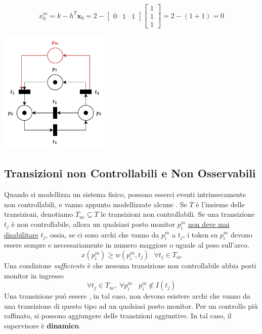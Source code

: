 \documentclass[10pt, letterpaper]{report}
\begin{document}
$$ x_0^m=k-h^T\mathbf x_0=2-\begin{bmatrix}
    0 & 1 & 1
\end{bmatrix}\begin{bmatrix}
    1 \\ 1 \\ 1
\end{bmatrix}=2-(1+1)=0$$\begin{center}
    \includegraphics[width=0.4\textwidth]{images/UsoMonitor2.drawio.pdf}
\end{center}
\subsection{Transizioni non Controllabili e Non Osservabili}
Quando si modellizza un sistema fisico, possono esserci eventi intrinsecamente non controllabili, e vanno appunto modellizzate alcune . Se $T$ è l'insieme delle transizioni, denotiamo $T_{uc}\subseteq T$ le transizioni non controllabili. \acc 
Se una transizione  $t_j$ è non controllabile, allora un qualsiasi posto monitor $p^m_i$ \underline{non deve mai disabilitare} $t_j$, ossia, se ci sono archi che vanno da $p^m_i$ a $t_j$, i token su $p^m_i$ devono essere sempre e necessariamente in numero maggiore o uguale al peso sull'arco. 
$$ x(p_i^m)\ge w(p_i^m,t_j) \ \ \ \forall t_j\in T_{uc}$$
Una condizione \textit{sufficiente} è che nessuna transizione non controllabile abbia posti monitor in ingresso 
$$ \forall t_j \in T_{uc}, \ \forall p_i^m \ \ \ \ p_i^m\notin I(t_j)$$
Una transizione può essere , in tal caso, non devono esistere archi che vanno da una transizione di questo tipo ad un qualsiasi posto monitor. Per un controllo più raffinato, si possono aggiungere delle transizioni aggiuntive. In tal caso, il supervisore è \textbf{dinamico}.
\end{document}
